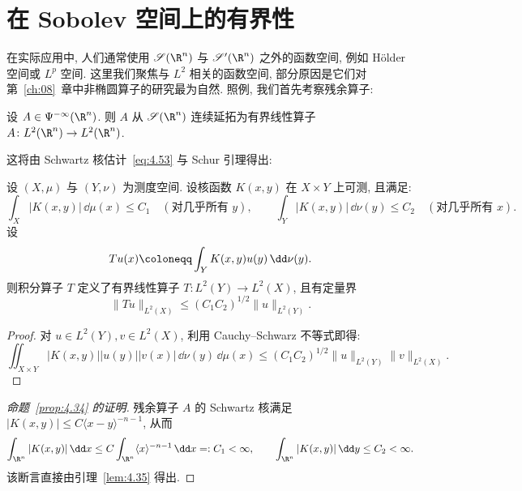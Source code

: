 \section{在 Sobolev 空间上的有界性}\label{sec:4.8}
%
%

在实际应用中, 人们通常使用 $\Schwartz(\R^n)$ 与 $\TempDistr(\R^n)$ 之外的函数空间, 例如 Hölder 空间或 $L^p$ 空间. 这里我们聚焦与 $L^2$ 相关的函数空间, 部分原因是它们对第~\ref{ch:08}~章中非椭圆算子的研究最为自然. 照例, 我们首先考察残余算子:

\begin{proposition}\label{prop:4.34}
设 $A \in \Psi^{-\infty}(\R^n)$. 则 $A$ 从 $\Schwartz(\R^n)$ 连续延拓为有界线性算子 $A \colon L^2(\R^n) \to L^2(\R^n)$.
\end{proposition}

这将由 Schwartz 核估计~\eqref{eq:4.53} 与 Schur 引理得出:

\begin{lemma}[Schur 引理]\label{lem:4.35}
设 $(X, \mu)$ 与 $(Y, \nu)$ 为测度空间. 设核函数 $K(x, y)$ 在 $X \times Y$ 上可测, 且满足:
\begin{equation}\label{eq:4.110}
    \int_X |K(x, y)| \,\dd\mu(x) \le C_1 \quad (\text{对几乎所有 } y), \qquad \int_Y |K(x, y)| \,\dd\nu(y) \le C_2 \quad (\text{对几乎所有 } x).
\end{equation}
设
\begin{equation}\label{eq:4.111}
    T u(x) \defeq \int_Y K(x, y) u(y) \,\dd\nu(y).
\end{equation}
则积分算子 $T$ 定义了有界线性算子 $T \colon L^2(Y) \to L^2(X)$, 且有定量界
\begin{equation}\label{eq:4.112}
    \|T u\|_{L^2(X)} \le (C_1 C_2)^{1/2} \|u\|_{L^2(Y)}.
\end{equation}
\end{lemma}

\begin{proof}
对 $u \in L^2(Y), v \in L^2(X)$, 利用 Cauchy--Schwarz 不等式即得:
\[
    \iint_{X \times Y} |K(x, y)| |u(y)| |v(x)| \,\dd\nu(y) \,\dd\mu(x) \le (C_1 C_2)^{1/2} \|u\|_{L^2(Y)} \|v\|_{L^2(X)}.
\]
\end{proof}

\begin{proof}[命题~\ref{prop:4.34} 的证明]
残余算子 $A$ 的 Schwartz 核满足 $|K(x, y)| \le C \langle x - y \rangle^{-n-1}$, 从而
\begin{equation}\label{eq:4.113}
    \int_{\R^n} |K(x, y)| \,\dd x \le C \int_{\R^n} \langle x \rangle^{-n-1} \,\dd x =: C_1 < \infty, \qquad \int_{\R^n} |K(x, y)| \,\dd y \le C_2 < \infty.
\end{equation}
该断言直接由引理~\ref{lem:4.35} 得出.
\end{proof}

